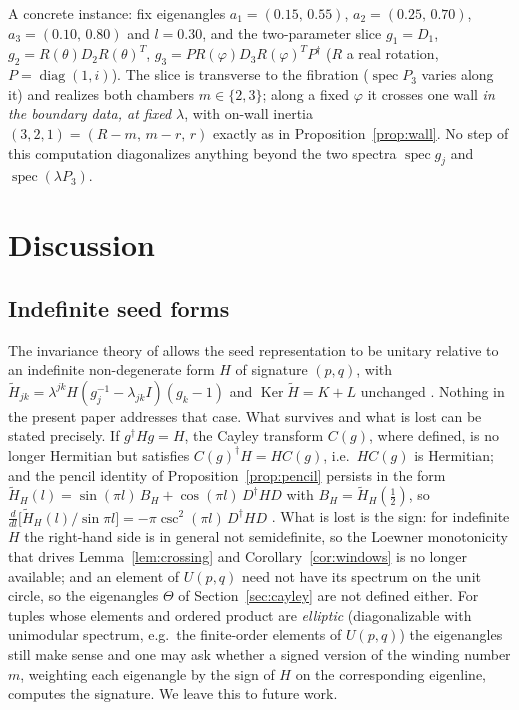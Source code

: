 \documentclass[11pt]{article}
\theoremstyle{definition}
\newcommand{\Ht}{\widetilde H}
\newcommand{\Ker}{\operatorname{Ker}}
\begin{document}
A concrete instance: fix eigenangles
$a_1=(0.15,\,0.55)$, $a_2=(0.25,\,0.70)$, $a_3=(0.10,\,0.80)$ and
$l=0.30$, and the two-parameter slice $g_1=D_1$,
$g_2=R(\theta)D_2R(\theta)^{T}$,
$g_3=PR(\varphi)D_3R(\varphi)^{T}P^{\dagger}$ ($R$ a real rotation,
$P=\operatorname{diag}(1,i)$). The slice is transverse to the
fibration ($\operatorname{spec}P_3$ varies along it) and realizes
both chambers $m\in\{2,3\}$; along a fixed $\varphi$ it crosses one
wall \emph{in the boundary data, at fixed $\lambda$}, with on-wall
inertia $(3,2,1)=(R-m,\,m-r,\,r)$ exactly as in
Proposition~\ref{prop:wall}. No step of
this computation diagonalizes anything beyond the two spectra
$\operatorname{spec}g_j$ and $\operatorname{spec}(\lambda P_3)$.


\section{Discussion}\label{sec:discussion}


\subsection{Indefinite seed forms}\label{subsec:indefinite}
The invariance theory of \cite{N-KLM} allows the seed representation
to be unitary relative to an indefinite non-degenerate form $H$ of
signature $(p,q)$, with $\Ht_{jk}=\lambda^{jk}H(g_j^{-1}-\lambda_{jk}I)(g_k-1)$
and $\Ker\Ht=K+L$ unchanged \cite[Thm.~9]{N-KLM}. Nothing in the
present paper addresses that case. What survives and what is lost
can be stated precisely. If $g^{\dagger}Hg=H$, the Cayley transform
$C(g)$, where defined, is no longer Hermitian but satisfies
$C(g)^{\dagger}H=HC(g)$, i.e.\ $HC(g)$ is Hermitian; and the pencil
identity of Proposition~\ref{prop:pencil} persists in the form
$\Ht_H(l)=\sin(\pi l)\,B_H+\cos(\pi l)\,D^{\dagger}HD$
with $B_H=\Ht_H(\tfrac12)$, so
$\frac{d}{dl}\bigl[\Ht_H(l)/\sin\pi l\bigr]
=-\pi\csc^{2}(\pi l)\,D^{\dagger}HD$
. What is lost is
the sign: for indefinite $H$ the right-hand side is in general not
semidefinite, so the Loewner monotonicity that drives
Lemma~\ref{lem:crossing} and Corollary~\ref{cor:windows} is no
longer available; and an element of $U(p,q)$ need not have its
spectrum on the unit circle, so the eigenangles $\Theta$ of
Section~\ref{sec:cayley} are not defined either. For tuples whose elements and ordered product are
\emph{elliptic} (diagonalizable with unimodular spectrum, e.g.\ the
finite-order elements of $U(p,q)$) the eigenangles still make sense
and one may ask whether a signed version of the winding number $m$,
weighting each eigenangle by the sign of $H$ on the corresponding
eigenline, computes the signature. We leave this to future work.
\end{document}
